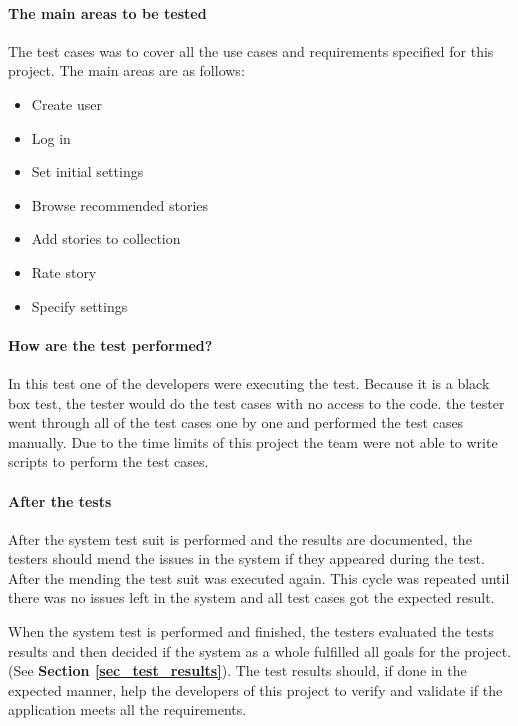 {\paragraph{The main areas to be tested}
The test cases was to cover all the use cases and requirements specified for this project. The main areas are as follows:
\begin{itemize}[noitemsep]
	\item Create user
	\item Log in
	\item Set initial settings
	\item Browse recommended stories
	\item Add stories to collection
	\item Rate story 
	\item Specify settings \newline
\end{itemize}

\paragraph{How are the test performed?}
In this test one of the developers were executing the test. Because it is a black box test, the tester would do the test cases with no access to the code. the tester went through all of the test cases one by one and performed the test cases manually. Due to the time limits of this project the team were not able to write scripts to perform the test cases. \newline

\paragraph{After the tests}
After the system test suit is performed and the results are documented, the testers should mend the issues in the system if they appeared during the test. After the mending the test suit was executed again. This cycle was repeated until there was no issues left in the system and all test cases got the expected result.\newline

When the system test is performed and finished, the testers evaluated the tests results and then decided if the system as a whole fulfilled all goals for the project.(See \textbf{Section \ref{sec_test_results}}). The test results should, if done in the expected manner, help the developers of this project to verify and validate if the application meets all the requirements.\newline

}
